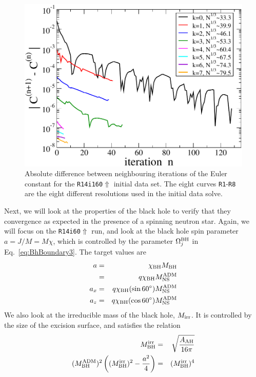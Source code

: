 \begin{figure}
\includegraphics[width=0.95\columnwidth]{chap4/EulerConv}
\caption[Convergence of the Euler constant for the {\tt R14160$\Uparrow$}]{\label{Fig:EulerConv}
Absolute difference between neighbouring iterations of the Euler constant for the {\tt R14i160$\Uparrow$} initial data set. The eight curves {\tt R1}-{\tt R8} are the eight different resolutions
used in the initial data solve.}
\end{figure}

Next, we will look at the properties of the black hole to verify that they convergence as expected in the presence of a spinning neutron star. Again, we will focus on the {\tt R14i60$\Uparrow$} run, and look at the black hole spin parameter $a=J/M=M\chi$, which is controlled by the parameter $\Omega_j^{\rm BH}$ in Eq.~\ref{eq:BhBoundary3}. The target values are
\begin{eqnarray}
a&=&\chi_{\rm BH}M_{\rm BH}\\
&=&q\chi_{\rm BH}M_{\rm NS}^{\rm ADM}\\
a_x&=&q\chi_{\rm BH}(\sin60^{\circ})M_{\rm NS}^{\rm ADM}\\
a_z&=&q\chi_{\rm BH}(\cos60^{\circ})M_{\rm NS}^{\rm ADM}
\end{eqnarray}
We also look at the irreducible mass of the black hole, $M_{\rm irr}$. It is controlled by the size of the excision surface, and satisfies the relation
\begin{eqnarray}
M_{\rm BH}^{\rm irr}&=&\sqrt{\frac{A_{\rm AH}}{16\pi}}\\
(M_{\rm BH}^{\rm ADM})^2\left((M_{\rm BH}^{\rm irr})^2-\frac{a^2}{4}\right)&=&(M_{\rm BH}^{\rm irr})^4
\end{eqnarray}


